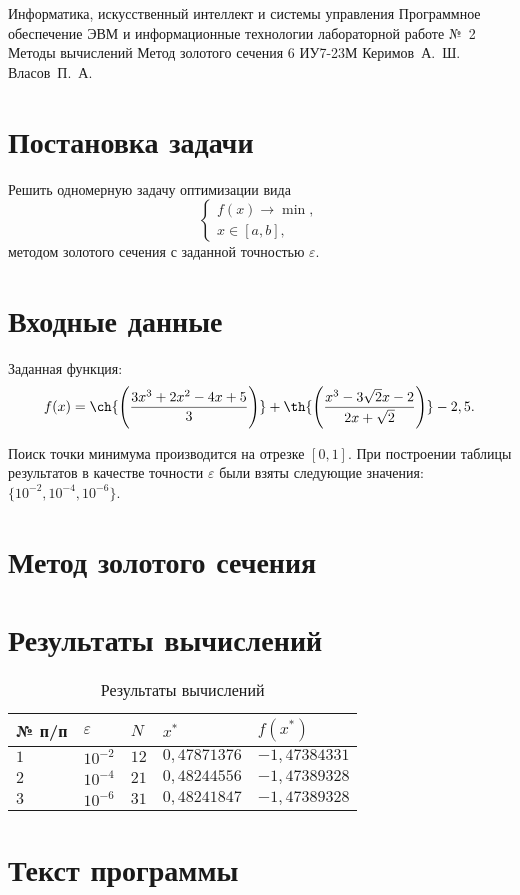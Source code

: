 \documentclass{bmstu-gost-7-32}
\begin{document}
\makereporttitle
	{Информатика, искусственный интеллект и системы управления} %
	{Программное обеспечение ЭВМ и информационные технологии} %
	{лабораторной работе №~2} %
	{Методы вычислений} %
	{Метод золотого сечения} %
	{6} %
	{ИУ7-23М} %
	{Керимов~А.~Ш.} %
	{Власов~П.~А.} %

\section*{Постановка задачи}

Решить одномерную задачу оптимизации вида
\begin{equation}
	\begin{cases}
		f(x) \to \min, \\
		x \in [a, b],
	\end{cases}
\end{equation}
методом золотого сечения с заданной точностью $\varepsilon$.

\section*{Входные данные}

Заданная функция:
\begin{equation}
	f(x) = \ch{\left(\frac{3x^3 + 2x^2 - 4x + 5}{3}\right)} + \th{\left(\frac{x^3 - 3\sqrt2x - 2}{2x + \sqrt2}\right)} - 2,5.
\end{equation}

Поиск точки минимума производится на отрезке $[0, 1]$.
При построении таблицы результатов в качестве точности $\varepsilon$ были взяты следующие значения: $\{10^{-2}, 10^{-4}, 10^{-6}\}$.

\section*{Метод золотого сечения}


\section*{Результаты вычислений}

\begin{table}[H]
	\caption{Результаты вычислений}
	\begin{tabular}{|l|l|l|l|l|}
		\hline
		№ п/п & $\varepsilon$ & $N$  & $x^*$     & $f(x^*)$   \\ \hline
		$1$   & $10^{-2}$     & $12$ & $0,47871376$ & $-1,47384331$ \\ \hline
		$2$   & $10^{-4}$     & $21$ & $0,48244556$ & $-1,47389328$ \\ \hline
		$3$   & $10^{-6}$     & $31$ & $0,48241847$ & $-1,47389328$ \\ \hline
	\end{tabular}
\end{table}

\section*{Текст программы}


\end{document}
